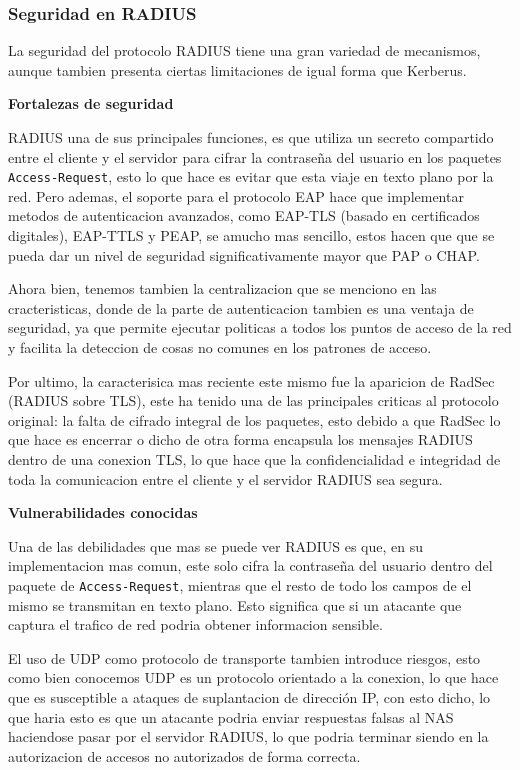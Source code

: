 \documentclass[letterpaper,12pt]{article}
\begin{document}
\subsubsection{Seguridad en RADIUS}

La seguridad del protocolo RADIUS tiene una gran variedad de mecanismos, 
aunque tambien presenta ciertas limitaciones de igual forma que Kerberus.

\textbf{Fortalezas de seguridad}

RADIUS una de sus principales funciones, es que utiliza un secreto compartido entre el cliente y el servidor 
para cifrar la contraseña del usuario en los paquetes \texttt{Access-Request}, 
esto lo que hace es evitar que esta viaje en texto plano por la red. 
Pero ademas, el soporte para el protocolo EAP hace que implementar metodos de autenticacion avanzados, 
como EAP-TLS (basado en certificados digitales), EAP-TTLS y PEAP, se amucho mas sencillo, estos hacen que 
que se pueda dar un nivel de seguridad significativamente mayor que PAP o CHAP.

Ahora bien, tenemos tambien la centralizacion que se menciono en las cracteristicas, donde 
de la parte de autenticacion tambien es una ventaja de seguridad, 
ya que permite ejecutar politicas a todos los puntos de acceso de la red y 
facilita la deteccion de cosas no comunes en los patrones de acceso.

Por ultimo, la caracterisica mas reciente este mismo fue la aparicion de RadSec 
(RADIUS sobre TLS), este ha tenido una de las principales criticas al protocolo original: 
la falta de cifrado integral de los paquetes, esto debido a que RadSec lo que hace es encerrar o dicho de otra forma 
encapsula los mensajes RADIUS dentro de una conexion TLS, 
lo que hace que la confidencialidad e integridad de toda la comunicacion entre el cliente y el servidor RADIUS sea segura.

\textbf{Vulnerabilidades conocidas}

Una de las debilidades que mas se puede ver RADIUS es que, 
en su implementacion mas comun, este solo cifra la contraseña del usuario dentro del paquete de \texttt{Access-Request},
mientras que el resto de todo los campos de el mismo se transmitan en texto plano. 
Esto significa que si un atacante que captura el trafico de red podria obtener
informacion sensible.

El uso de UDP como protocolo de transporte tambien introduce riesgos,
esto como bien conocemos UDP es un protocolo orientado a la conexion, lo que hace que es susceptible a
ataques de suplantacion de direcci\'on IP, con esto dicho, lo que haria esto es que
un atacante podria enviar respuestas falsas al NAS haciendose pasar por el servidor RADIUS, 
lo que podria terminar siendo en la autorizacion de accesos no autorizados de forma correcta.
\end{document}
